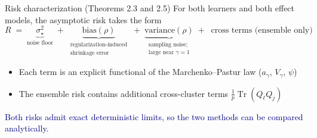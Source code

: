 \documentclass[aspectratio=169,11pt]{beamer}
\newcommand{\takeaway}[1]{%
  \vfill
  {\centering\colorbox{navy!8}{\parbox{0.92\textwidth}{\centering\small\textcolor{navy}{#1}}}\par}}
\newcommand{\Tr}{\operatorname{Tr}}
\begin{document}
\begin{frame}{Risk characterization (Theorems 2.3 and 2.5)}
  For both learners and both effect models, the asymptotic risk takes the form
  \[
    R \;=\; \underbrace{\sigma_\star^2}_{\text{noise floor}}
    \;+\; \underbrace{\text{bias}(\rho)}_{\substack{\text{regularization-induced}\\ \text{shrinkage error}}}
    \;+\; \underbrace{\text{variance}(\rho)}_{\substack{\text{sampling noise;}\\ \text{large near }\gamma=1}}
    \;+\;\; \text{cross terms (ensemble only)}
  \]
  \vspace{1mm}
  \begin{itemize}
    \item Each term is an explicit functional of the Marchenko--Pastur law ($a_\gamma$, $V_\gamma$, $\psi$)
    \item The ensemble risk contains additional cross-cluster terms $\tfrac1p\Tr(Q_\ell Q_j)$
  \end{itemize}
  \takeaway{Both risks admit exact deterministic limits, so the two methods can be compared analytically.}
\end{frame}
\end{document}
